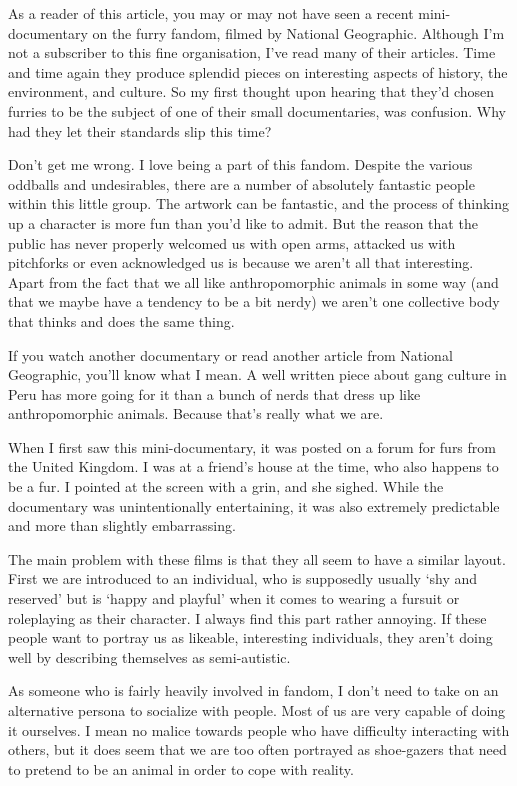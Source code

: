 
As a reader of this article, you may or may not have seen a recent mini-documentary on the furry fandom, filmed by National Geographic. Although I'm not a subscriber to this fine organisation, I've read many of their articles. Time and time again they produce splendid pieces on interesting aspects of history, the environment, and culture. So my first thought upon hearing that they'd chosen furries to be the subject of one of their small documentaries, was confusion. Why had they let their standards slip this time?

Don't get me wrong. I love being a part of this fandom. Despite the various oddballs and undesirables, there are a number of absolutely fantastic people within this little group. The artwork can be fantastic, and the process of thinking up a character is more fun than you'd like to admit. But the reason that the public has never properly welcomed us with open arms, attacked us with pitchforks or even acknowledged us is because we aren't all that interesting. Apart from the fact that we all like anthropomorphic animals in some way (and that we maybe have a tendency to be a bit nerdy) we aren't one collective body that thinks and does the same thing.

If you watch another documentary or read another article from National Geographic, you'll know what I mean. A well written piece about gang culture in Peru has more going for it than a bunch of nerds that dress up like anthropomorphic animals. Because that's really what we are.

When I first saw this mini-documentary, it was posted on a forum for furs from the United Kingdom. I was at a friend's house at the time, who also happens to be a fur. I pointed at the screen with a grin, and she sighed. While the documentary was unintentionally entertaining, it was also extremely predictable and more than slightly embarrassing.

The main problem with these films is that they all seem to have a similar layout. First we are introduced to an individual, who is supposedly usually `shy and reserved' but is `happy and playful' when it comes to wearing a fursuit or roleplaying as their character. I always find this part rather annoying. If these people want to portray us as likeable, interesting individuals, they aren't doing well by describing themselves as semi-autistic.

As someone who is fairly heavily involved in fandom, I don't need to take on an alternative persona to socialize with people. Most of us are very capable of doing it ourselves. I mean no malice towards people who have difficulty interacting with others, but it does seem that we are too often portrayed as shoe-gazers that need to pretend to be an animal in order to cope with reality.

